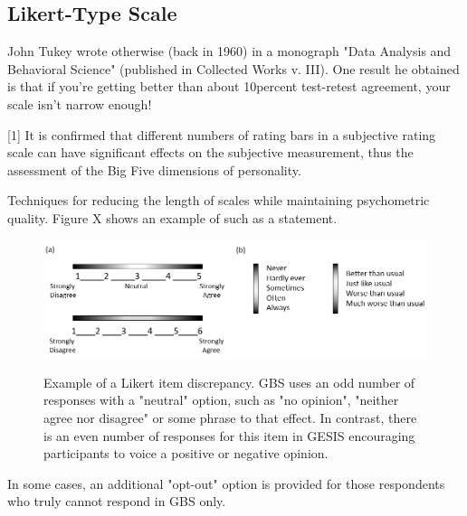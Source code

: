 \subsection{Likert-Type Scale}

John Tukey wrote otherwise (back in 1960) in a monograph "Data Analysis and Behavioral Science" (published in Collected Works v. III). One result he obtained is that if you're getting better than about 10percent test-retest agreement, your scale isn't narrow enough!



[1] It is confirmed that different numbers of rating bars in a subjective rating scale can have significant effects on the subjective measurement, thus the assessment of the Big Five dimensions of personality.

Techniques for reducing the length of scales while maintaining psychometric quality.
Figure X shows an example of such as a statement.

\begin{figure}[ht]
	\begin{center}
		\includegraphics[scale=0.55,angle=0]{fig/scales}
		\label{6_5}
		\caption{Example of a Likert item discrepancy. GBS uses an odd number of responses with a "neutral" option, such as "no opinion", "neither agree nor disagree" or some phrase to that effect. In contrast, there is an even number of responses for this item in GESIS encouraging participants to voice a positive or negative opinion.}
	\end{center}
\end{figure}

In some cases, an additional "opt-out" option is provided for those respondents who truly cannot respond in GBS only.

